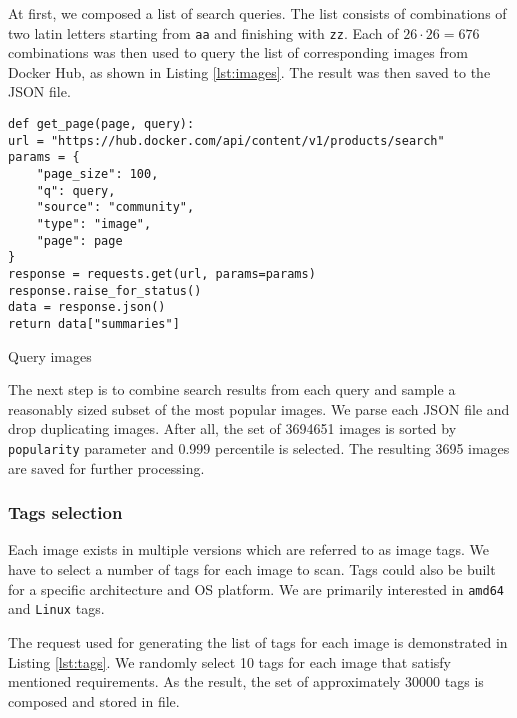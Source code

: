 At first, we composed a list of search queries. The list consists of combinations of two latin letters starting from \texttt{aa} and finishing with \texttt{zz}. Each of $26 \cdot 26 = 676$ combinations was then used to query the list of corresponding images from Docker Hub, as shown in Listing \ref{lst:images}. The result was then saved to the JSON file.
\begin{listing}[htp]
    \centering
    \begin{minipage}{0.8\linewidth}
        \begin{verbatim}
def get_page(page, query):
url = "https://hub.docker.com/api/content/v1/products/search"
params = {
    "page_size": 100,
    "q": query,
    "source": "community",
    "type": "image",
    "page": page
}
response = requests.get(url, params=params)
response.raise_for_status()
data = response.json()
return data["summaries"]
        \end{verbatim}
    \end{minipage}
    \caption{Query images}
    \label{lst:images}
\end{listing}

The next step is to combine search results from each query and sample a reasonably sized subset of the most popular images. We parse each JSON file and drop duplicating images. After all, the set of 3694651 images is sorted by \texttt{popularity} parameter and 0.999 percentile is selected. The resulting 3695 images are saved for further processing.

\subsubsection{Tags selection}

Each image exists in multiple versions which are referred to as image tags. We have to select a number of tags for each image to scan. Tags could also be built for a specific architecture and OS platform. We are primarily interested in \texttt{amd64} and \texttt{Linux} tags. 

The request used for generating the list of tags for each image is demonstrated in Listing \ref{lst:tags}. We randomly select 10 tags for each image that satisfy mentioned requirements. As the result, the set of approximately 30000 tags is composed and stored in file.

